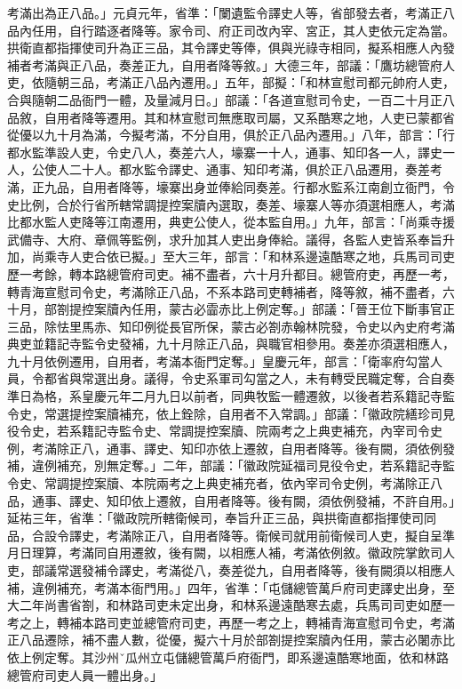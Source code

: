 \begin{pinyinscope}
考滿出為正八品。」元貞元年，省準：「闌遺監令譯史人等，省部發去者，考滿正八品內任用，自行踏逐者降等。家令司、府正司改內宰、宮正，其人吏依元定為當。拱衛直都指揮使司升為正三品，其令譯史等俸，俱與光祿寺相同，擬系相應人內發補者考滿與正八品，奏差正九，自用者降等敘。」大德三年，部議：「鷹坊總管府人吏，依隨朝三品，考滿正八品內遷用。」五年，部擬：「和林宣慰司都元帥府人吏，合與隨朝二品衙門一體，及量減月日。」部議：「各道宣慰司令史，一百二十月正八品敘，自用者降等遷用。其和林宣慰司無應取司屬，又系酷寒之地，人吏已蒙都省從優以九十月為滿，今擬考滿，不分自用，俱於正八品內遷用。」八年，部言：「行都水監準設人吏，令史八人，奏差六人，壕寨一十人，通事、知印各一人，譯史一人，公使人二十人。都水監令譯史、通事、知印考滿，俱於正八品遷用，奏差考滿，正九品，自用者降等，壕寨出身並俸給同奏差。行都水監系江南創立衙門，令史比例，合於行省所轄常調提控案牘內選取，奏差、壕寨人等亦須選相應人，考滿比都水監人吏降等江南遷用，典吏公使人，從本監自用。」九年，部言：「尚乘寺援武備寺、大府、章佩等監例，求升加其人吏出身俸給。議得，各監人吏皆系奉旨升加，尚乘寺人吏合依已擬。」至大三年，部言：「和林系邊遠酷寒之地，兵馬司司吏歷一考餘，轉本路總管府司吏。補不盡者，六十月升都目。總管府吏，再歷一考，轉青海宣慰司令史，考滿除正八品，不系本路司吏轉補者，降等敘，補不盡者，六十月，部劄提控案牘內任用，蒙古必霝赤比上例定奪。」部議：「晉王位下斷事官正三品，除怯里馬赤、知印例從長官所保，蒙古必劄赤翰林院發，令史以內史府考滿典吏並籍記寺監令史發補，九十月除正八品，與職官相參用。奏差亦須選相應人，九十月依例遷用，自用者，考滿本衙門定奪。」皇慶元年，部言：「衛率府勾當人員，令都省與常選出身。議得，令史系軍司勾當之人，未有轉受民職定奪，合自奏準日為格，系皇慶元年二月九日以前者，同典牧監一體遷敘，以後者若系籍記寺監令史，常選提控案牘補充，依上銓除，自用者不入常調。」部議：「徽政院繕珍司見役令史，若系籍記寺監令史、常調提控案牘、院兩考之上典吏補充，內宰司令史例，考滿除正八，通事、譯史、知印亦依上遷敘，自用者降等。後有闕，須依例發補，違例補充，別無定奪。」二年，部議：「徽政院延福司見役令史，若系籍記寺監令史、常調提控案牘、本院兩考之上典吏補充者，依內宰司令史例，考滿除正八品，通事、譯史、知印依上遷敘，自用者降等。後有闕，須依例發補，不許自用。」延祐三年，省準：「徽政院所轄衛候司，奉旨升正三品，與拱衛直都指揮使司同品，合設令譯史，考滿除正八，自用者降等。衛候司就用前衛候司人吏，擬自呈準月日理算，考滿同自用遷敘，後有闕，以相應人補，考滿依例敘。徽政院掌飲司人吏，部議常選發補令譯史，考滿從八，奏差從九，自用者降等，後有闕須以相應人補，違例補充，考滿本衙門用。」四年，省準：「屯儲總管萬戶府司吏譯史出身，至大二年尚書省劄，和林路司吏未定出身，和林系邊遠酷寒去處，兵馬司司吏如歷一考之上，轉補本路司吏並總管府司吏，再歷一考之上，轉補青海宣慰司令史，考滿正八品遷除，補不盡人數，從優，擬六十月於部劄提控案牘內任用，蒙古必闍赤比依上例定奪。其沙州ˇ瓜州立屯儲總管萬戶府衙門，即系邊遠酷寒地面，依和林路總管府司吏人員一體出身。」




\end{pinyinscope}
